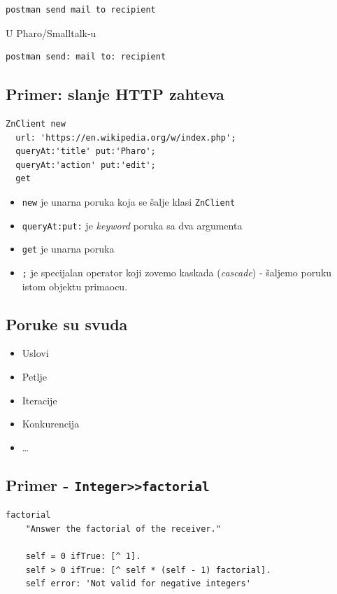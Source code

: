 \documentclass[presentation]{beamer}
\begin{document}
\begin{verbatim}
postman send mail to recipient
\end{verbatim}

U Pharo/Smalltalk-u

\begin{verbatim}
postman send: mail to: recipient
\end{verbatim}

\subsection{Primer: slanje HTTP zahteva}
\label{sec:org9e3f1f1}

\begin{verbatim}
ZnClient new
  url: 'https://en.wikipedia.org/w/index.php';
  queryAt:'title' put:'Pharo';
  queryAt:'action' put:'edit';
  get
\end{verbatim}

\begin{itemize}
\item \texttt{new} je unarna poruka koja se šalje klasi \texttt{ZnClient}
\item \texttt{queryAt:put:} je \emph{keyword} poruka sa dva argumenta
\item \texttt{get} je unarna poruka
\item \texttt{;} je specijalan operator koji zovemo kaskada (\emph{cascade}) - šaljemo poruku
istom objektu primaocu.
\end{itemize}

\subsection{Poruke su svuda}
\label{sec:orga16d4de}

\begin{itemize}
\item Uslovi
\item Petlje
\item Iteracije
\item Konkurencija
\item \ldots{}
\end{itemize}

\subsection{Primer - \texttt{Integer>>factorial}}
\label{sec:org305d836}

\begin{verbatim}
factorial
	"Answer the factorial of the receiver."

	self = 0 ifTrue: [^ 1].
	self > 0 ifTrue: [^ self * (self - 1) factorial].
	self error: 'Not valid for negative integers'
\end{verbatim}
\end{document}
